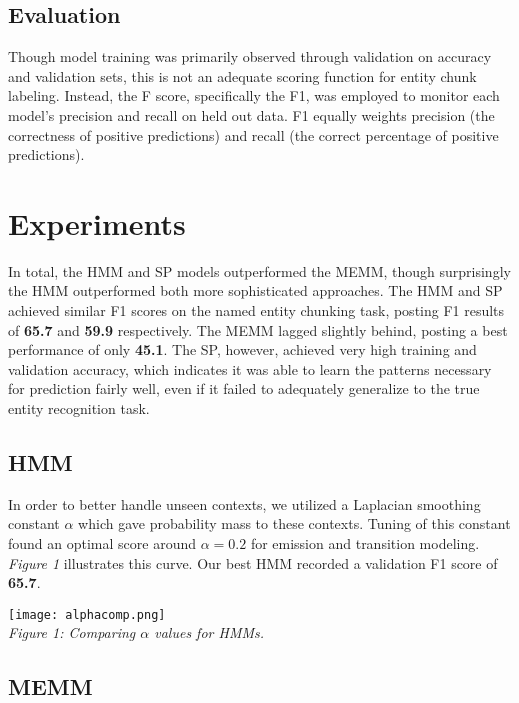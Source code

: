 \documentclass[11pt]{article}
\begin{document}
\subsection{Evaluation}
Though model training was primarily observed through validation on accuracy and validation sets, this is not an adequate scoring function for entity chunk labeling. Instead, the F score, specifically the F1, was employed to monitor each model's precision and recall on held out data. F1 equally weights precision (the correctness of positive predictions) and recall (the correct percentage of positive predictions).

\section{Experiments}

In total, the HMM and SP models outperformed the MEMM, though surprisingly the HMM outperformed both more sophisticated approaches. The HMM and SP achieved similar F1 scores on the named entity chunking task, posting F1 results of \textbf{65.7} and \textbf{59.9} respectively. The MEMM lagged slightly behind, posting a best performance of only \textbf{45.1}. The SP, however, achieved very high training and validation accuracy, which indicates it was able to learn the patterns necessary for prediction fairly well, even if it failed to adequately generalize to the true entity recognition task.

\subsection{HMM}
In order to better handle unseen contexts, we utilized a Laplacian smoothing constant $\alpha$ which gave probability mass to these contexts. Tuning of this constant found an optimal score around $\alpha=0.2$ for emission and transition modeling. \textit{Figure 1} illustrates this curve. Our best HMM recorded a validation F1 score of \textbf{65.7}.

\begin{center}
    \texttt{[image: alphacomp.png]}\\
    \textit{Figure 1: Comparing $\alpha$ values for HMMs.}
\end{center}

\subsection{MEMM}
\end{document}
